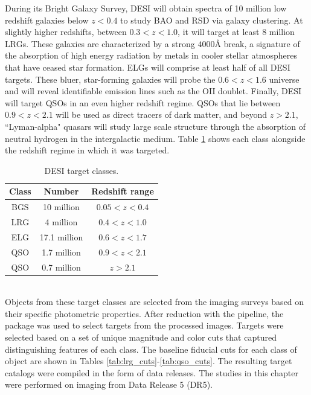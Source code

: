 During its Bright Galaxy Survey, DESI will obtain spectra of 10 million low redshift galaxies below $z<0.4$ to study BAO and RSD via galaxy clustering. At slightly higher redshifts, between $0.3<z<1.0$, it will target at least 8 million LRGs. These galaxies are characterized by a strong $4000\mbox{\AA}$ break, a signature of the absorption of high energy radiation by metals in cooler stellar atmospheres that have ceased star formation. ELGs will comprise at least half of all DESI targets. These bluer, star-forming galaxies will probe the $0.6<z<1.6$ universe and will reveal identifiable emission lines such as the OII doublet. 
Finally, DESI will target QSOs in an even higher redshift regime. QSOs that lie between $0.9<z<2.1$ will be used as direct tracers of dark matter, and beyond $z>2.1$, ``Lyman-alpha" quasars will study large scale structure through the absorption of neutral hydrogen in the intergalactic medium. Table \ref{tab:targets} shows each class alongside the redshift regime in which it was targeted.

\begin{table}
\caption{DESI target classes.}
\label{tab:targets}
\centering
\begin{tabular}{|c|c|c|}
  \hline
  Class & Number & Redshift range\\
  \hline \hline
  BGS & 10 million & $0.05<z<0.4$ \\
  \hline
  LRG & 4 million & $0.4<z<1.0$ \\
  \hline
  ELG & 17.1 million & $0.6<z<1.7$ \\
  \hline
  QSO & 1.7 million & $0.9<z<2.1$ \\
  \hline
  QSO & 0.7 million & $z>2.1$\\
  \hline
\end{tabular}
\end{table}\\

Objects from these target classes are selected from the imaging surveys based on their specific photometric properties. After reduction with the  pipeline, the  package was used to select targets from the processed images. Targets were selected based on a set of unique magnitude and color cuts that captured distinguishing features of each class. The baseline fiducial cuts for each class of object are shown in Tables \ref{tab:lrg_cuts}-\ref{tab:qso_cuts}. The resulting target catalogs were compiled in the form of data releases. The studies in this chapter were performed on imaging from Data Release 5 (DR5).


